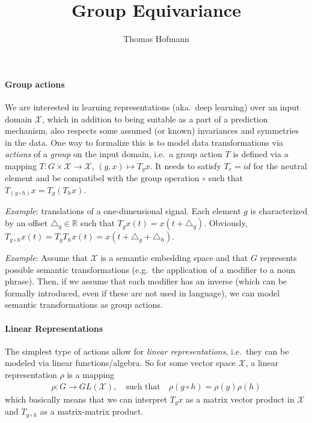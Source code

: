 \documentclass{article}
\author{Thomas Hofmann}
\title{Group Equivariance}
\renewcommand{\Re}{{\mathbb R}}
\newcommand{\X}{{\mathcal X}}
\begin{document}
\maketitle

\paragraph{Group actions} We are interested in learning representations (aka.~deep learning) over an input domain $\X$, which in addition to being suitable as a part of a prediction mechanism, also respects some assumed (or known) invariances and symmetries in the data. One way to formalize this is to model data transformations via \textit{actions} of a \textit{group} on the input domain, i.e.~a group action $T$ is defined via a mapping $T: G \times \X \to \X$, $(g,x) \mapsto T_g x$. It needs to satisfy $T_e = id$ for the neutral element and be compatibel with the group operation $\circ$ such that $T_{(g \circ h)}x = T_g (T_h x)$.

\textit{Example}: translations of a one-dimensional signal. Each element $g$ is characterized by an offset $\triangle_g \in \Re$ such that $T_g x(t) = x(t+ \triangle_g)$. Obviously, $T_{g \circ h} x(t) = T_{g} T_h x(t) = x(t + \triangle_g + \triangle_h)$. 

\textit{Example}: Assume that $\X$ is a semantic embedding space and that $G$ represents possible semantic transformations (e.g.~the application of a modifier to a noun phrase). Then, if we assume that each modifier has an inverse (which can be formally introduced, even if these are not used in language), we can model semantic transformations as group actions.  

\paragraph{Linear Representations} The simplest type of actions allow for \textit{linear representations}, i.e.~they can be modeled via linear functions/algebra. So for some vector space $\X$, a linear representation $\rho$ is a mapping 
\begin{align}
\rho: G \to GL(\X), \quad \text{such that} \quad \rho(g \circ h) = \rho(g) \rho(h) 
\end{align} 
which basically means that we can interpret $T_g x$ as a matrix vector product in $\X$ and $T_{g \circ h}$ as a matrix-matrix product. 
\end{document}
